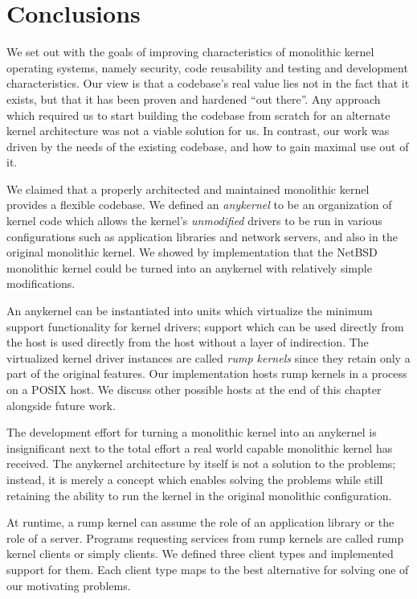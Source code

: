 
\section{Conclusions}
\label{chap:conclusions}

We set out with the goals of improving characteristics of monolithic
kernel operating systems, namely security, code reusability and
testing and development characteristics.  Our view is that a
codebase's real value lies not in the fact that it exists, but that
it has been proven and hardened ``out there''.
Any approach which required us to start building the codebase from
scratch for an alternate kernel architecture was not a viable
solution for us.  In contrast, our work was driven by the needs of
the existing codebase, and how to gain maximal use out of it.

We claimed that a properly architected and maintained monolithic
kernel provides a flexible codebase.  We defined an \textit{anykernel}
to be an organization of kernel code which allows the kernel's
\textit{unmodified} drivers to be run in various configurations
such as application libraries and network servers, and also in the
original monolithic kernel.  We showed by implementation that the
NetBSD monolithic kernel could be turned into an anykernel with
relatively simple modifications.

An anykernel can be instantiated into units which virtualize the
minimum support functionality for kernel drivers; support which can be
used directly from the host is used directly from the host without a
layer of indirection.  The virtualized kernel driver instances
are called \textit{rump kernels} since they retain only a part of the
original features.  Our implementation hosts rump kernels in a process
on a POSIX host.  We discuss other possible hosts at the end of this
chapter alongside future work.

The development effort for turning a monolithic kernel into an
anykernel is insignificant next to the total effort a real world
capable monolithic kernel has received.  The anykernel architecture by
itself is not a solution to the problems; instead, it is merely a concept
which enables solving the problems while still retaining the ability to
run the kernel in the original monolithic configuration.

At runtime, a rump kernel can assume the role of an application library
or the role of a server.  Programs requesting services from rump kernels are
called rump kernel clients or simply clients.  We defined three client
types and implemented support for them.  Each client type maps to the
best alternative for solving one of our motivating problems.


